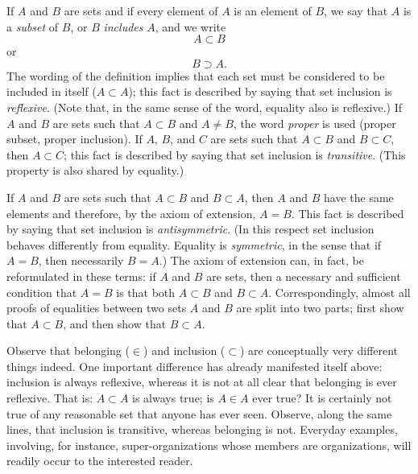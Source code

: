If $A$ and $B$ are sets and if every element of $A$ is an element of $B$, we say that $A$ is a \textit{subset} of $B$, or $B$ \textit{includes} $A$, and we write
\[
	A \subset B
\]
or
\[
	B \supset A.
\]
The wording of the definition implies that each set must be considered to be included in itself ($A \subset A$); this fact is described by saying that set inclusion is \textit{reflexive}. (Note that, in the same sense of the word, equality also is reflexive.) If $A$ and $B$ are sets such that $A \subset B$ and $A \neq B$, the word \textit{proper} is used (proper subset, proper inclusion). If $A, \, B$, and $C$ are sets such that $A \subset B$ and $B \subset C$, then $A \subset C$; this fact is described by saying that set inclusion is \textit{transitive}. (This property is also shared by equality.)

If $A$ and $B$ are sets such that $A \subset B$ and $B \subset A$, then $A$ and $B$ have the same elements and therefore, by the axiom of extension, $A = B$. This fact is described by saying that set inclusion is \textit{antisymmetric}. (In this respect set inclusion behaves differently from equality. Equality is \textit{symmetric}, in the sense that if $A = B$, then necessarily $B = A$.) The axiom of extension can, in fact, be reformulated in these terms: if $A$ and $B$ are sets, then a necessary and sufficient condition that $A = B$ is that both $A \subset B$ and $B \subset A$. Correspondingly, almost all proofs of equalities between two sets $A$ and $B$ are split into two parts; first show that $A \subset B$, and then show that $B \subset A$.

Observe that belonging ($\in$) and inclusion ($\subset$) are conceptually very different things indeed. One important difference has already manifested itself above: inclusion is always reflexive, whereas it is not at all clear that belonging is ever reflexive. That is: $A \subset A$ is always true; is $A \in A$ ever true? It is certainly not true of any reasonable set that anyone has ever seen. Observe, along the same lines, that inclusion is transitive, whereas belonging is not. Everyday examples, involving, for instance, super-organizations whose members are organizations, will readily occur to the interested reader. 